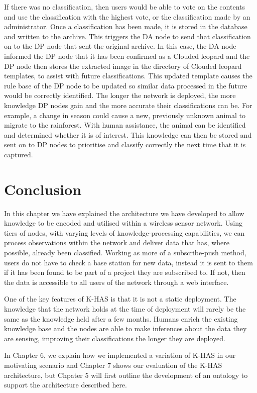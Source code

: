			If there was no classification, then users would be able to vote on the contents and use the classification with the highest vote, or the classification made by an administrator. Once a classification has been made, it is stored in the database and written to the archive. This triggers the DA node to send that classification on to the DP node that sent the original archive. In this case, the DA node informed the DP node that it has been confirmed as a Clouded leopard and the DP node then stores the extracted image in the directory of Clouded leopard templates, to assist with future classifications. This updated template causes the rule base of the DP node to be updated so similar data processed in the future would be correctly identified. The longer the network is deployed, the more knowledge DP nodes gain and the more accurate their classifications can be. For example, a change in season could cause a new, previously unknown animal to migrate to the rainforest. With human assistance, the animal can be identified and determined whether it is of interest. This knowledge can then be stored and sent on to DP nodes to prioritise and classify correctly the next time that it is captured.
					
	\section{Conclusion}
		In this chapter we have explained the architecture we have developed to allow knowledge to be encoded and utilised within a wireless sensor network. Using tiers of nodes, with varying levels of knowledge-processing capabilities, we can process observations within the network and deliver data that has, where possible, already been classified. Working as more of a subscribe-push method, users do not have to check a base station for new data, instead it is sent to them if it has been found to be part of a project they are subscribed to. If not, then the data is accessible to all users of the network through a web interface.
		
		One of the key features of K-HAS is that it is not a static deployment. The knowledge that the network holds at the time of deployment will rarely be the same as the knowledge held after a few months. Humans enrich the existing knowledge base and the nodes are able to make inferences about the data they are sensing, improving their classifications the longer they are deployed.
		
		In Chapter 6, we explain how we implemented a variation of K-HAS in our motivating scenario and Chapter 7 shows our evaluation of the K-HAS architecture, but Chpater 5 will first outline the development of an ontology to support the architecture described here.
		
			
			
			
			
			
			
			
			